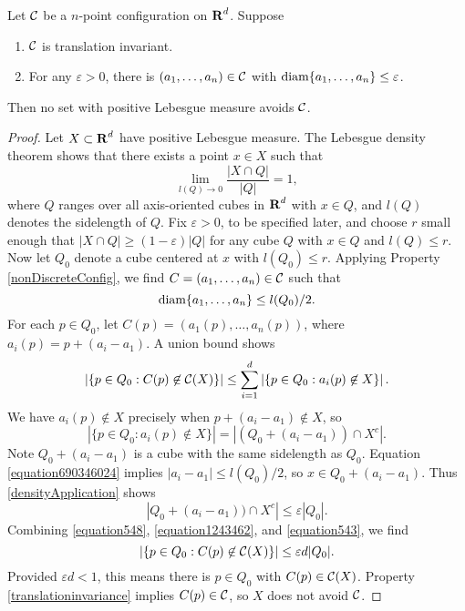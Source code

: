\begin{theorem}
	Let $\operatorname{\mathcal{C}}$ be a $n$-point configuration on $\operatorname{\mathbf{R}}^d$. Suppose
	\begin{enumerate}
		\item \label{translationinvariance} $\operatorname{\mathcal{C}}$ is translation invariant.
		\item \label{nonDiscreteConfig} For any $\varepsilon > 0$, there is $(a_1, \dots, a_n) \in \operatorname{\mathcal{C}}$ with $\operatorname{\text{diam}} \{ a_1, \dots, a_n \} \leq \varepsilon$.
	\end{enumerate}
	Then no set with positive Lebesgue measure avoids $\operatorname{\mathcal{C}}$.
\end{theorem}
\begin{proof}
	Let $X \subset \operatorname{\mathbf{R}}^d$ have positive Lebesgue measure. The Lebesgue density theorem shows that there exists a point $x \in X$ such that
	\begin{equation} \label{densityApplication} \lim_{l(Q) \to 0} \frac{|X \cap Q|}{|Q|} = 1, \end{equation}
	where $Q$ ranges over all axis-oriented cubes in $\operatorname{\mathbf{R}}^d$ with $x \in Q$, and $l(Q)$ denotes the sidelength of $Q$. Fix $\varepsilon > 0$, to be specified later, and choose $r$ small enough that $|X \cap Q| \geq (1 - \varepsilon) |Q|$ for any cube $Q$ with $x \in Q$ and $l(Q) \leq r$. Now let $Q_0$ denote a cube centered at $x$ with $l(Q_0) \leq r$. Applying Property \ref{nonDiscreteConfig}, we find $C = (a_1, \dots, a_n) \in \operatorname{\mathcal{C}}$ such that
	\begin{equation} \label{equation690346024} \operatorname{\text{diam}} \{ a_1, \dots, a_n \} \leq l(Q_0)/2. \end{equation}
	For each $p \in Q_0$, let $C(p) = (a_1(p), \dots, a_n(p))$, where $a_i(p) = p + (a_i - a_1)$. A union bound shows
	\begin{equation} \label{equation548} \left| \{ p \in Q_0 : C(p) \not \in \operatorname{\mathcal{C}}(X) \} \right| \leq \sum_{i = 1}^d \left| \{ p \in Q_0 : a_i(p) \not \in X \} \right|.
	\end{equation}
	We have $a_i(p) \not \in X$ precisely when $p + (a_i - a_1) \not \in X$, so
	\begin{equation} \label{equation1243462}
		|\{ p \in Q_0 : a_i(p) \not \in X \}| = |(Q_0 + (a_i - a_1)) \cap X^c|.
	\end{equation}
	Note $Q_0 + (a_i - a_1)$ is a cube with the same sidelength as $Q_0$. Equation \eqref{equation690346024} implies $|a_i - a_1| \leq l(Q_0)/2$, so $x \in Q_0 + (a_i - a_1)$. Thus \eqref{densityApplication} shows
	\begin{equation} \label{equation543} |Q_0 + (a_i - a_1)) \cap X^c| \leq \varepsilon |Q_0|. \end{equation}
	Combining \eqref{equation548}, \eqref{equation1243462}, and \eqref{equation543}, we find
	\[ \left| \{ p \in Q_0 : C(p) \not \in \operatorname{\mathcal{C}}(X) \} \right| \leq \varepsilon d |Q_0|. \]
	Provided $\varepsilon d < 1$, this means there is $p \in Q_0$ with $C(p) \in \operatorname{\mathcal{C}}(X)$. Property \ref{translationinvariance} implies $C(p) \in \operatorname{\mathcal{C}}$, so $X$ does not avoid $\operatorname{\mathcal{C}}$.
\end{proof}

